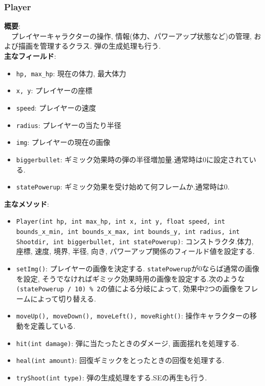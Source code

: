 \documentclass[11pt,a4j]{jarticle}
\begin{document}
\subsubsection{Player}
\noindent\textbf{概要}: \\
　プレイヤーキャラクターの操作, 情報(体力、パワーアップ状態など)の管理, および描画を管理するクラス. 弾の生成処理も行う.\\
\noindent\textbf{主なフィールド}:
\begin{itemize}
  \item \texttt{hp, max\_hp}: 現在の体力, 最大体力
  \item \texttt{x, y}: プレイヤーの座標
  \item \texttt{speed}: プレイヤーの速度
  \item \texttt{radius}: プレイヤーの当たり半径
  \item \texttt{img}: プレイヤーの現在の画像
  \item \texttt{biggerbullet}: ギミック効果時の弾の半径増加量.通常時は0に設定されている.
  \item \texttt{statePowerup}: ギミック効果を受け始めて何フレームか.通常時は0.
\end{itemize}
\noindent\textbf{主なメソッド}:
\begin{itemize}
  \item \texttt{Player(int hp, int max\_hp, int x, int y, float speed, int bounds\_x\_min, int bounds\_x\_max, int bounds\_y,
            int radius, int Shootdir, int biggerbullet, int statePowerup)}: コンストラクタ.体力, 座標, 速度, 境界, 半径, 向き, パワーアップ関係のフィールド値を設定する.
  \item \texttt{setImg()}: プレイヤーの画像を決定する. \texttt{statePowerup}が0ならば通常の画像を設定, そうでなければギミック効果時用の画像を設定する.次のような\texttt{(statePowerup / 10) \% 2}の値による分岐によって, 効果中2つの画像をフレームによって切り替える.
  \item \texttt{moveUp(), moveDown(), moveLeft(), moveRight()}: 操作キャラクターの移動を定義している.
  \item \texttt{hit(int damage)}: 弾に当たったときのダメージ, 画面揺れを処理する.
  \item \texttt{heal(int amount)}: 回復ギミックをとったときの回復を処理する.
  \item \texttt{tryShoot(int type)}: 弾の生成処理をする.SEの再生も行う.
\end{itemize}
\end{document}
